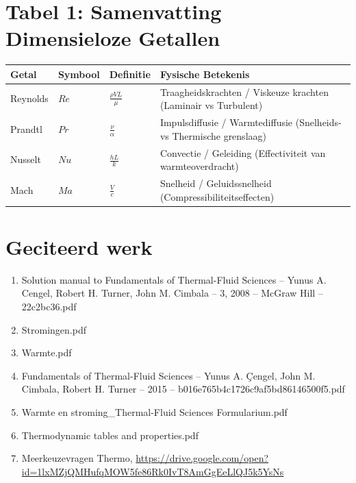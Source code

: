 \documentclass[a4paper,11pt,twoside]{report}
\begin{document}

\section*{Tabel 1: Samenvatting Dimensieloze Getallen}
\begin{table}[h]
\centering
\begin{tabular}{@{}llll@{}}
\toprule
\textbf{Getal} & \textbf{Symbool} & \textbf{Definitie} & \textbf{Fysische Betekenis} \\ \midrule
Reynolds & $Re$ & $\frac{\rho V L}{\mu}$ & Traagheidskrachten / Viskeuze krachten (Laminair vs Turbulent) \\
Prandtl & $Pr$ & $\frac{\nu}{\alpha}$ & Impulsdiffusie / Warmtediffusie (Snelheids- vs Thermische grenslaag) \\
Nusselt & $Nu$ & $\frac{h L}{k}$ & Convectie / Geleiding (Effectiviteit van warmteoverdracht) \\
Mach & $Ma$ & $\frac{V}{c}$ & Snelheid / Geluidssnelheid (Compressibiliteitseffecten) \\ \bottomrule
\end{tabular}
\end{table}

\section*{Geciteerd werk}
\begin{enumerate}
    \item Solution manual to Fundamentals of Thermal-Fluid Sciences -- Yunus A. Cengel, Robert H. Turner, John M. Cimbala -- 3, 2008 -- McGraw Hill -- 22c2bc36.pdf
    \item Stromingen.pdf
    \item Warmte.pdf
    \item Fundamentals of Thermal-Fluid Sciences -- Yunus A. Çengel, John M. Cimbala, Robert H. Turner -- 2015 -- b016e765b4c1726c9af5bd86146500f5.pdf
    \item Warmte en stroming\_Thermal-Fluid Sciences Formularium.pdf
    \item Thermodynamic tables and properties.pdf
    \item Meerkeuzevragen Thermo, \url{https://drive.google.com/open?id=1lxMZjQMHufqMOW5fe86Rk0IvT8AmGgEeLlQJ5k5YsNs}
\end{enumerate}
\end{document}
